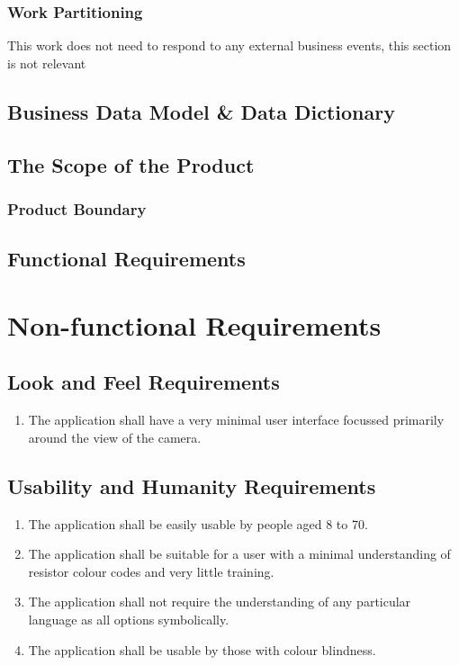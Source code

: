\documentclass{article}
\begin{document}
\subsubsection{Work Partitioning}

This work does not need to respond to any external business events, this section is not relevant

\subsection{Business Data Model \& Data Dictionary}
\subsection{The Scope of the Product}

\subsubsection{Product Boundary}


\subsection{Functional Requirements}


\section{Non-functional Requirements}

\subsection{Look and Feel Requirements }
\begin{enumerate}
\item The application shall have a very minimal user interface focussed primarily around the view of the camera.
\end{enumerate}
\subsection{Usability and Humanity Requirements}
\begin{enumerate}
\item The application shall be easily usable by people aged 8 to 70.
\item The application shall be suitable for a user with a minimal understanding of resistor colour codes and very little training.
\item The application shall not require the understanding of any particular language as all options symbolically.
\item The application shall be usable by those with colour blindness.
\end{enumerate}
\end{document}
